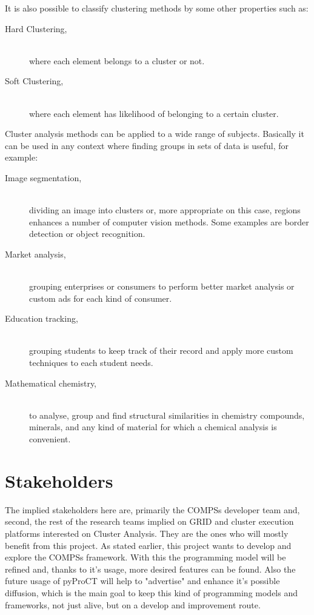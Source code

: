 It is also possible to classify clustering methods by some other properties such as:

\begin{description}
\item [Hard Clustering,] \hfill \\ where each element belongs to a cluster or not.
\item [Soft Clustering,] \hfill \\ where each element has likelihood of belonging to a certain cluster.
\end{description}




Cluster analysis methods can be applied to a wide range of subjects. Basically it can be used in any context where finding groups in sets of data is useful, for example:

\begin{description}
\item [Image segmentation,] \hfill \\ dividing an image into clusters or, more appropriate on this case, regions enhances a number of computer vision methods. Some examples are border detection or object recognition. \cite{Ayech2015}
\item [Market analysis,] \hfill \\ grouping enterprises \cite{Burca2014} or consumers \cite{Muller2014} to perform better market analysis or custom ads for each kind of consumer.
\item [Education tracking,] \hfill \\ grouping students to keep track of their record and apply more custom techniques to each student needs. \cite{Chan2014}
\item [Mathematical chemistry,] \hfill \\ to analyse, group and find structural similarities in chemistry compounds, minerals, and any kind of material for which a chemical analysis is convenient. \cite{Cortes2007}
\end{description}


\section{Stakeholders}

The implied stakeholders here are, primarily the COMPSs developer team and, second, the rest of the research teams implied on GRID and cluster execution platforms interested on Cluster Analysis. They are the ones who will mostly benefit from this project. As stated earlier, this project wants to develop and explore the COMPSs framework. With this the programming model will be refined and, thanks to it's usage, more desired features can be found. Also the future usage of pyProCT will help to "advertise" and enhance it's possible diffusion, which is the main goal to keep this kind of programming models and frameworks, not just alive, but on a develop and improvement route.

